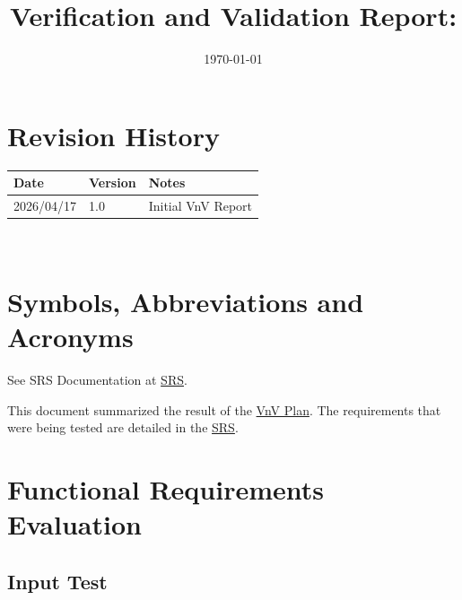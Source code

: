 \documentclass[12pt, titlepage]{article}
\begin{document}
\title{Verification and Validation Report: \progname} 
\author{\authname}
\date{\today}
	
\maketitle


\section{Revision History}

\begin{tabularx}{\textwidth}{p{3cm}p{2cm}X}
\toprule {\bf Date} & {\bf Version} & {\bf Notes}\\
\midrule
2026/04/17 & 1.0 & Initial VnV Report\\
\bottomrule
\end{tabularx}

~\newpage

\section{Symbols, Abbreviations and Acronyms}

See SRS Documentation at \href{https://mei0725.github.io/FlockingSimulator/SRS/SRS.pdf}{SRS}.

\newpage

\tableofcontents

\listoftables %

\listoffigures %

\newpage


This document summarized the result of the 
\href{https://mei0725.github.io/FlockingSimulator/VnVPlan/VnVPlan.pdf}{VnV Plan}. 
The requirements that were being tested are detailed in the 
\href{https://mei0725.github.io/FlockingSimulator/SRS/SRS.pdf}{SRS}.

\section{Functional Requirements Evaluation} \label{sec_funcEval}

\subsection{Input Test} \label{inputTest}
\end{document}
